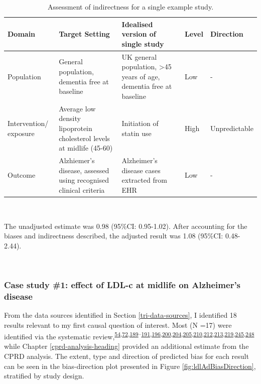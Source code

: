 \documentclass[a4paper, twoside]{templates/ociamthesis}
\begin{document}
\begin{table}[H]

\caption[singleIndirect]{\label{tab:singleIndirect-table}Assessment of indirectness for a single example study.}
\centering
\begin{tabular}[t]{>{\raggedright\arraybackslash}p{5em}>{\centering\arraybackslash}p{9em}>{\centering\arraybackslash}p{9em}>{\centering\arraybackslash}p{5em}>{\centering\arraybackslash}p{6em}}
\toprule
\textbf{Domain} & \textbf{Target Setting} & \textbf{Idealised version of single study} & \textbf{Level} & \textbf{Direction}\\
\midrule
Population & General population, dementia free at baseline & UK general population, >45 years of age, dementia free at baseline & Low & -\\
\midrule
Intervention/ exposure & Average low density lipoprotein cholesterol levels at midlife (45-60) & Initiation of statin use & High & Unpredictable\\
\midrule
Outcome & Alzhiemer's disease, assessed using recognised clinical criteria & Alzheimer's disease cases extracted from EHR & Low & -\\
\bottomrule
\end{tabular}
\end{table}

~

The unadjusted estimate was 0.98 (95\%CI: 0.95-1.02). After accounting for the biases and indirectness described, the adjusted result was 1.08 (95\%CI: 0.48-2.44).

~

\hypertarget{case-study-1-effect-of-ldl-c-at-midlife-on-alzheimers-disease}{%
\subsubsection{Case study \#1: effect of LDL-c at midlife on Alzheimer's disease}\label{case-study-1-effect-of-ldl-c-at-midlife-on-alzheimers-disease}}

From the data sources identified in Section \ref{tri-data-sources}, I identified 18 results relevant to my first causal question of interest. Most (N =17) were identified via the systematic review,\textsuperscript{\protect\hyperlink{ref-schilling2017}{54},\protect\hyperlink{ref-ostergaard2015}{72},\protect\hyperlink{ref-ancelin2012}{189}--\protect\hyperlink{ref-bettermann2012}{191},\protect\hyperlink{ref-chou2014}{196},\protect\hyperlink{ref-haag2009}{200},\protect\hyperlink{ref-li2004}{204},\protect\hyperlink{ref-li2010}{205},\protect\hyperlink{ref-rea2005}{210},\protect\hyperlink{ref-reitz2010}{212},\protect\hyperlink{ref-smeeth2009}{213},\protect\hyperlink{ref-zandi2005}{219},\protect\hyperlink{ref-tynkkynen2018}{245},\protect\hyperlink{ref-yoshitake1995}{248}} while Chapter \ref{cprd-analysis-heading} provided an additional estimate from the CPRD analysis. The extent, type and direction of predicted bias for each result can be seen in the bias-direction plot presented in Figure \ref{fig:ldlAdBiasDirection}, stratified by study design.
\end{document}

